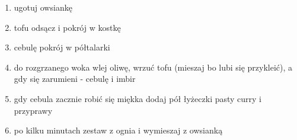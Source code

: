 \documentclass[./KNIGA.tex]{subfiles}
\begin{document}
\begin{enumerate}
\item ugotuj owsiankę
\item tofu odsącz i pokrój w kostkę
\item cebulę pokrój w półtalarki
\item do rozgrzanego woka wlej oliwę, wrzuć tofu (mieszaj bo lubi się przykleić), a gdy się zarumieni - cebulę i imbir
\item gdy cebula zacznie robić się miękka dodaj pół łyżeczki pasty curry i przyprawy
\item po kilku minutach zestaw z ognia i wymieszaj z owsianką 
\end{enumerate}
\end{document}
